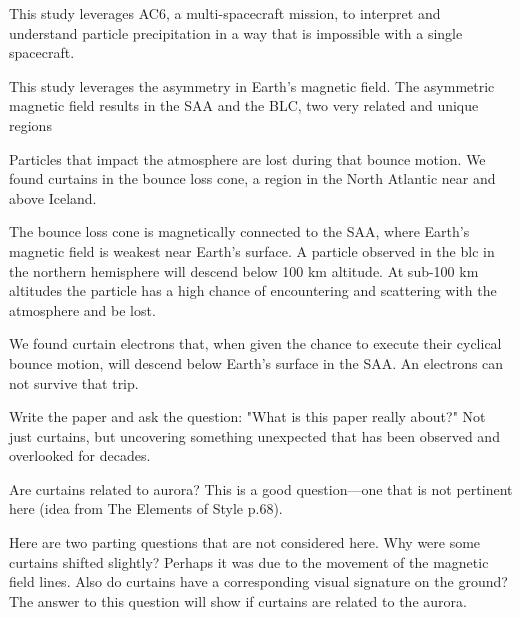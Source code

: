 \documentclass[draft]{agujournal2019}
\begin{document}
This study leverages AC6, a multi-spacecraft mission, to interpret and understand particle precipitation in a way that is impossible with a single spacecraft.

This study leverages the asymmetry in Earth's magnetic field. The asymmetric magnetic field results in the SAA and the BLC, two very related and unique regions

Particles that impact the atmosphere are lost during that bounce motion. We found curtains in the bounce loss cone, a region in the North Atlantic near and above Iceland.

The bounce loss cone is magnetically connected to the SAA, where Earth's magnetic field is weakest near Earth's surface. A particle observed in the blc in the northern hemisphere will descend below 100 km altitude. At sub-100 km altitudes the particle has a high chance of encountering and scattering with the atmosphere and be lost. 

We found curtain electrons that, when given the chance to execute their cyclical bounce motion, will descend below Earth's surface in the SAA. An electrons can not survive that trip.

Write the paper and ask the question: "What is this paper really about?" Not just curtains, but uncovering something unexpected that has been observed and overlooked for decades.

Are curtains related to aurora? This is a good question---one that is not pertinent here (idea from The Elements of Style p.68).

Here are two parting questions that are not considered here. Why were some curtains shifted slightly? Perhaps it was due to the movement of the magnetic field lines. Also do curtains have a corresponding visual signature on the ground? The answer to this question will show if curtains are related to the aurora.


%
\end{document}
